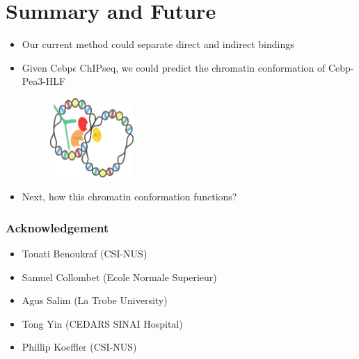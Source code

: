 \documentclass[notes]{beamer}
\begin{document}
\section{Summary and Future}
    \begin{frame}
        \begin{itemize}[<+->]
            \item Our current method could separate direct and indirect bindings 
            \item Given Cebp$\epsilon$ ChIPseq, we could predict the chromatin conformation of Cebp-Pea3-HLF
            \begin{figure}
                \includegraphics[width=0.3\textwidth, height=0.3\textwidth]{../Images/cebpConformation.png}
            \end{figure}
            \item Next, how this chromatin conformation functions?
        \end{itemize}
    \end{frame} 

\begin{frame}[plain]
    \frametitle{Acknowledgement}
    \begin{itemize}
        \item Touati Benoukraf (CSI-NUS)
        \item Samuel Collombet (Ecole Normale Superieur)
        \item Agus Salim (La Trobe University)
        \item Tong Yin (CEDARS SINAI Hospital)
        \item Phillip Koeffler (CSI-NUS)
    \end{itemize}
\end{frame}
\end{document}
